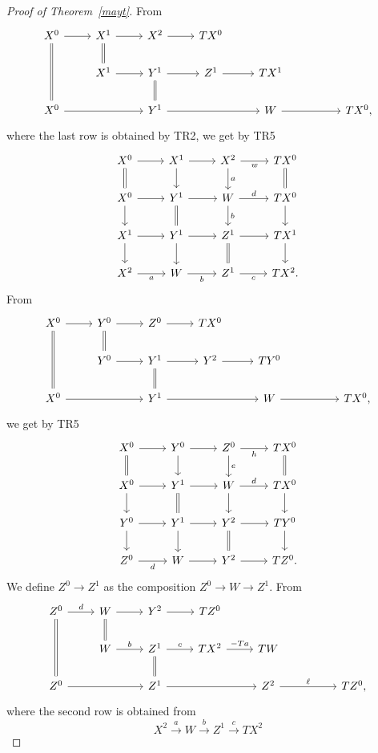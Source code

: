 \documentclass[12pt]{article}
\theoremstyle{remark}
\theoremstyle{definition}
\begin{document}
\begin{proof}[Proof of Theorem~\ref{mayt}]
From 
$$
\begin{tikzcd}
X^0\ar[equal]{dd}\ar{r}&X^1\ar[equal]{d}\ar{r}&X^2\ar{r}&TX^0\\
&X^1\ar{r}&Y^1\ar[equal]{d}\ar{r}&Z^1\ar{r}&TX^1\\
X^0\ar{rr}&&Y^1\ar{rr}&&W\ar{rr}&&TX^0,
\end{tikzcd}
$$
where the last row is obtained by TR2, we get by TR5
\begin{equation}\label{v1}
\begin{tikzcd}
X^0\ar{r}\ar[equal]{d}&X^1\ar{d}\ar{r}&X^2\ar{d}{a}\ar{r}[swap]{w}&TX^0\ar[equal]{d}\\
X^0\ar{d}\ar{r}&Y^1\ar{r}\ar[equal]{d}&W\ar{d}{b}\ar{r}{d}&TX^0\ar{d}\\
X^1\ar{d}\ar{r}&Y^1\ar{d}\ar{r}&Z^1\ar{r}\ar[equal]{d}&TX^1\ar{d}\\
X^2\ar{r}[swap]{a}&W\ar{r}[swap]{b}&Z^1\ar{r}[swap]{c}&TX^2.
\end{tikzcd}
\end{equation}
%
From 
$$
\begin{tikzcd}
X^0\ar[equal]{dd}\ar{r}&Y^0\ar[equal]{d}\ar{r}&Z^0\ar{r}&TX^0\\
&Y^0\ar{r}&Y^1\ar[equal]{d}\ar{r}&Y^2\ar{r}&TY^0\\
X^0\ar{rr}&&Y^1\ar{rr}&&W\ar{rr}&&TX^0,
\end{tikzcd}
$$
we get by TR5
\begin{equation}\label{v2}
\begin{tikzcd}
X^0\ar{r}\ar[equal]{d}&Y^0\ar{d}\ar{r}&Z^0\ar{d}{e}\ar{r}[swap]{h}&TX^0\ar[equal]{d}\\
X^0\ar{d}\ar{r}&Y^1\ar{r}\ar[equal]{d}&W\ar{d}\ar{r}{d}&TX^0\ar{d}\\
Y^0\ar{d}\ar{r}&Y^1\ar{d}\ar{r}&Y^2\ar{r}\ar[equal]{d}&TY^0\ar{d}\\
Z^0\ar{r}[swap]{d}&W\ar{r}&Y^2\ar{r}&TZ^0.
\end{tikzcd}
\end{equation}
%
We define $Z^0\to Z^1$ as the composition $Z^0\to W\to Z^1$. From 
$$
\begin{tikzcd}
Z^0\ar[equal]{dd}\ar{r}{d}&W\ar[equal]{d}\ar{r}&Y^2\ar{r}&TZ^0\\
&W\ar{r}{b}&Z^1\ar[equal]{d}\ar{r}{c}&TX^2\ar{r}{-Ta}&TW\\
Z^0\ar{rr}&&Z^1\ar{rr}&&Z^2\ar{rr}{\ell}&&TZ^0,
\end{tikzcd}
$$
where the second row is obtained from 
$$
X^2\overset{a}{\to}W\overset{b}{\to}Z^1\overset{c}{\to}TX^2
$$
\end{proof}
\end{document}
